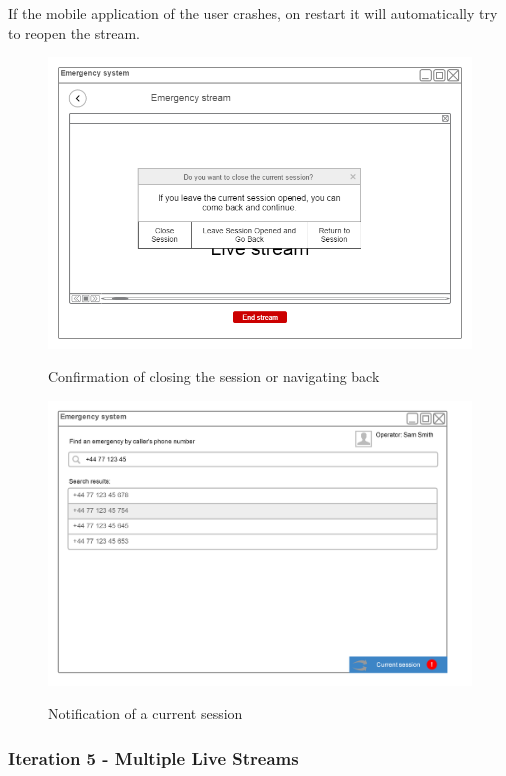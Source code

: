 \documentclass{article}
\begin{document}
If the mobile application of the user crashes, on restart it will automatically try to reopen the stream.\\
	\begin{figure}[H]
		\centering
		\includegraphics[width=.9\textwidth]{"EmergencyAppIteration4/iteration4backendconfirmdialog (1)"}
		
		Confirmation of closing the session or navigating back
	\end{figure}
	\begin{figure}[H]
		\centering
		\includegraphics[width=.9\textwidth]{"EmergencyAppIteration4/current_session_search_screen"}
		
		 Notification of a current session
	\end{figure}
	
	
	
	\pagebreak
	\subsubsection{Iteration 5 - Multiple Live Streams}
\end{document}
